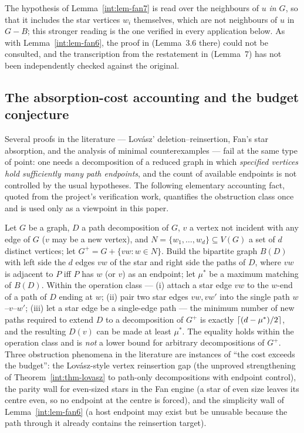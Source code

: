 \begin{remark}\label{int:rem-fan7}
The hypothesis of Lemma~\ref{int:lem-fan7} is read over the neighbours of $u$ \emph{in
$G$}, so that it includes the star vertices $w_i$ themselves, which are not neighbours of
$u$ in $G-B$; this stronger reading is the one verified in every application below. As with
Lemma~\ref{int:lem-fan6}, the proof in \cite{Fan05} (Lemma~3.6 there) could not be
consulted, and the transcription from the restatement in \cite{BS21} (Lemma~7) has not been
independently checked against the original.
\end{remark}

\subsection{The absorption-cost accounting and the budget conjecture}\label{int:subsec-budget}

Several proofs in the literature --- Lov\'asz' deletion--reinsertion, Fan's star absorption,
and the analysis of minimal counterexamples --- fail at the same type of point: one needs a
decomposition of a reduced graph in which \emph{specified vertices hold sufficiently many
path endpoints}, and the count of available endpoints is not controlled by the usual
hypotheses. The following elementary accounting fact, quoted from the project's
verification work, quantifies the obstruction class once and is used only as a viewpoint in
this paper.

\begin{remark}\label{rem:absorb}
Let $G$ be a graph, $D$ a path decomposition of $G$, $v$ a vertex not incident with any
edge of $G$ ($v$ may be a new vertex), and $N=\{w_1,\dots,w_d\}\subseteq V(G)$ a set of $d$
distinct vertices; let $G^+=G+\{vw: w\in N\}$. Build the bipartite graph $B(D)$ with left
side the $d$ edges $vw$ of the star and right side the paths of $D$, where $vw$ is adjacent
to $P$ iff $P$ has $w$ (or $v$) as an endpoint; let $\mu^*$ be a maximum matching of
$B(D)$. Within the operation class --- (i) attach a star edge $vw$ to the $w$-end of a path
of $D$ ending at $w$; (ii) pair two star edges $vw,vw'$ into the single path $w$--$v$--$w'$;
(iii) let a star edge be a single-edge path --- the minimum number of new paths required to
extend $D$ to a decomposition of $G^+$ is exactly $\left\lceil (d-\mu^*)/2 \right\rceil$, and the resulting
$D(v)$ can be made at least $\mu^*$. The equality holds within the operation class and is
\emph{not} a lower bound for arbitrary decompositions of $G^+$. Three obstruction
phenomena in the literature are instances of ``the cost exceeds the budget'': the
Lov\'asz-style vertex reinsertion gap (the unproved strengthening of
Theorem~\ref{int:thm-lovasz} to path-only decompositions with endpoint control), the parity
wall for even-sized stars in the Fan engine (a star of even size leaves its centre even, so
no endpoint at the centre is forced), and the simplicity wall of Lemma~\ref{int:lem-fan6} (a
host endpoint may exist but be unusable because the path through it already contains the
reinsertion target).
\end{remark}

